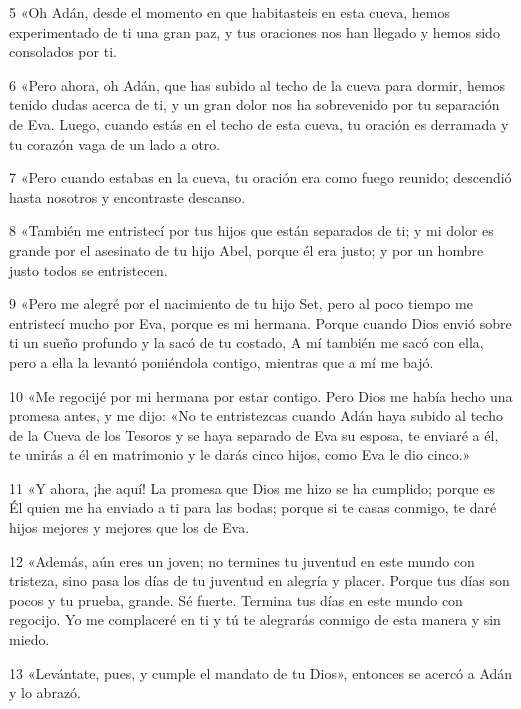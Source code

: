 \par 5 «Oh Adán, desde el momento en que habitasteis en esta cueva, hemos experimentado de ti una gran paz, y tus oraciones nos han llegado y hemos sido consolados por ti.

\par 6 «Pero ahora, oh Adán, que has subido al techo de la cueva para dormir, hemos tenido dudas acerca de ti, y un gran dolor nos ha sobrevenido por tu separación de Eva. Luego, cuando estás en el techo de esta cueva, tu oración es derramada y tu corazón vaga de un lado a otro.

\par 7 «Pero cuando estabas en la cueva, tu oración era como fuego reunido; descendió hasta nosotros y encontraste descanso.

\par 8 «También me entristecí por tus hijos que están separados de ti; y mi dolor es grande por el asesinato de tu hijo Abel, porque él era justo; y por un hombre justo todos se entristecen.

\par 9 «Pero me alegré por el nacimiento de tu hijo Set, pero al poco tiempo me entristecí mucho por Eva, porque es mi hermana. Porque cuando Dios envió sobre ti un sueño profundo y la sacó de tu costado, A mí también me sacó con ella, pero a ella la levantó poniéndola contigo, mientras que a mí me bajó.

\par 10 «Me regocijé por mi hermana por estar contigo. Pero Dios me había hecho una promesa antes, y me dijo: «No te entristezcas cuando Adán haya subido al techo de la Cueva de los Tesoros y se haya separado de Eva su esposa, te enviaré a él, te unirás a él en matrimonio y le darás cinco hijos, como Eva le dio cinco.»

\par 11 «Y ahora, ¡he aquí! La promesa que Dios me hizo se ha cumplido; porque es Él quien me ha enviado a ti para las bodas; porque si te casas conmigo, te daré hijos mejores y mejores que los de Eva.

\par 12 «Además, aún eres un joven; no termines tu juventud en este mundo con tristeza, sino pasa los días de tu juventud en alegría y placer. Porque tus días son pocos y tu prueba, grande. Sé fuerte. Termina tus días en este mundo con regocijo. Yo me complaceré en ti y tú te alegrarás conmigo de esta manera y sin miedo.

\par 13 «Levántate, pues, y cumple el mandato de tu Dios», entonces se acercó a Adán y lo abrazó.


